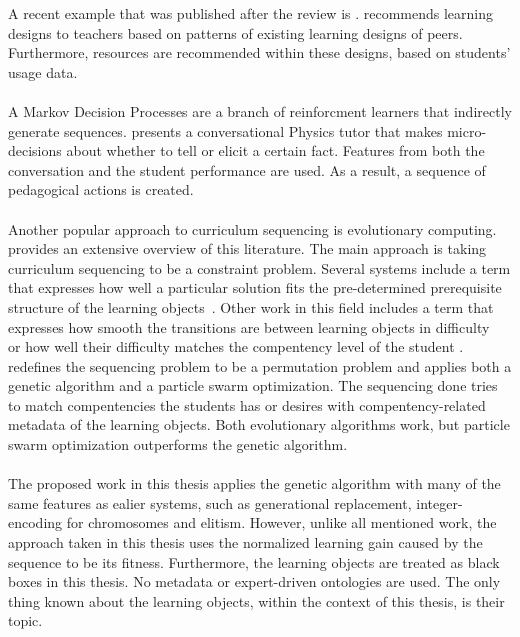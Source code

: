 A recent example that was published after the review is \citep{Verbert2012}.
\citet{Verbert2012} recommends learning designs to teachers based on patterns
of existing learning designs of peers. Furthermore, resources are recommended
within these designs, based on students' usage data.\\\\
\noindent
A Markov Decision Processes are a branch of reinforcment learners that
indirectly generate sequences. \citep{Chi2010} presents a conversational
Physics tutor that makes micro-decisions about whether to tell or elicit a
certain fact. Features from both the conversation and the student performance
are used. As a result, a sequence of pedagogical actions is created.\\\\
\noindent
Another popular approach to curriculum sequencing is evolutionary computing.
\citet{AlMuhaideb2011} provides an extensive overview of this literature.
The main approach is taking curriculum sequencing to be a constraint
problem. Several systems include a term that expresses how
well a particular solution fits the pre-determined prerequisite structure of
the learning objects~\citep{Seki2005, Chen2009, Samia2007}.
Other work in this field includes a term that expresses how smooth the
transitions are between learning objects in difficulty~\citep{Hovakimyan2004,
Seki2005, Chen2008, Huang2007} or how well their difficulty matches the
compentency level of the student \citep{Seki2005, Chen2008, Chen2009,
Samia2007, Huang2007}. \citet{deMarcos2009, deMarcos2007} redefines the
sequencing problem to be a permutation problem and applies both a genetic
algorithm and a particle swarm optimization. The sequencing done tries to
match compentencies the students has or desires with compentency-related
metadata of the learning objects. Both evolutionary algorithms work, but
particle swarm optimization outperforms the genetic algorithm.\\\\
\noindent
The proposed work in this thesis applies the genetic algorithm with many of the
same features as ealier systems, such as generational replacement,
integer-encoding for chromosomes and elitism. However, unlike all mentioned work, the approach taken in this thesis
uses the normalized learning gain caused by the sequence to be its fitness.
Furthermore, the learning objects are treated as black boxes in this thesis. No
metadata or expert-driven ontologies are used. The only thing known about the
learning objects, within the context of this thesis, is their topic. 
